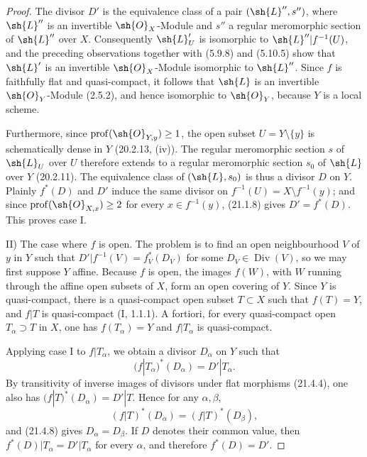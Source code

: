 \begin{proof}
The divisor $D'$ is the equivalence class of a pair
$(\sh{L}'',s'')$, where $\sh{L}''$ is an invertible $\sh{O}_X$-Module
and $s''$ a regular meromorphic section of $\sh{L}''$ over $X$.
Consequently $\sh{L}'_U$ is isomorphic to
$\sh{L}''|f^{-1}(U)$, and the preceding observations together with
(5.9.8) and (5.10.5) show that $\sh{L}'$ is an invertible
$\sh{O}_X$-Module isomorphic to $\sh{L}''$.  Since $f$ is faithfully
flat and quasi-compact, it follows that $\sh{L}$ is an invertible
$\sh{O}_Y$-Module (2.5.2), and hence isomorphic to $\sh{O}_Y$, because
$Y$ is a local scheme.

Furthermore, since $\operatorname{prof}(\sh{O}_{Y,y})\geq 1$, the open
subset $U=Y\setminus\{y\}$ is schematically dense in $Y$
(20.2.13, (iv)).  The regular meromorphic section $s$ of $\sh{L}_U$
over $U$ therefore extends to a regular meromorphic section $s_0$ of
$\sh{L}$ over $Y$ (20.2.11).  The equivalence class of
$(\sh{L},s_0)$ is thus a divisor $D$ on $Y$.  Plainly $f^*(D)$ and
$D'$ induce the same divisor on
$f^{-1}(U)=X\setminus f^{-1}(y)$; and since
$\operatorname{prof}(\sh{O}_{X,x})\geq 2$ for every
$x\in f^{-1}(y)$, (21.1.8) gives $D'=f^*(D)$.  This proves case I.

\textup{II) The case where $f$ is open.}
The problem is to find an open neighbourhood $V$ of $y$ in $Y$ such
that $D'|f^{-1}(V)=f_V^*(D_V)$ for some
$D_V\in\operatorname{Div}(V)$, so we may first suppose $Y$ affine.
Because $f$ is open, the images $f(W)$, with $W$ running through the
affine open subsets of $X$, form an open covering of $Y$.  Since $Y$
is quasi-compact, there is a quasi-compact open subset $T\subset X$
such that $f(T)=Y$, and $f|T$ is quasi-compact (I, 1.1.1).  A fortiori,
for every quasi-compact open $T_\alpha\supset T$ in $X$, one has
$f(T_\alpha)=Y$ and $f|T_\alpha$ is quasi-compact.

Applying case I to $f|T_\alpha$, we obtain a divisor $D_\alpha$ on
$Y$ such that
\[
 (f|T_\alpha)^*(D_\alpha)=D'|T_\alpha.
\]
By transitivity of inverse images of divisors under flat morphisms
(21.4.4), one also has
$(f|T)^*(D_\alpha)=D'|T$.  Hence for any $\alpha,\beta$,
\[
 (f|T)^*(D_\alpha)=(f|T)^*(D_\beta),
\]
and (21.4.8) gives $D_\alpha=D_\beta$.  If $D$ denotes their common
value, then $f^*(D)|T_\alpha=D'|T_\alpha$ for every $\alpha$, and
therefore $f^*(D)=D'$.
\end{proof}


